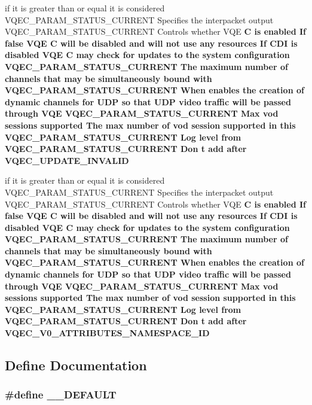 \begin{CompactItemize}
\item 
if it is greater than or equal it is considered VQEC\_\-PARAM\_\-STATUS\_\-CURRENT Specifies the interpacket output VQEC\_\-PARAM\_\-STATUS\_\-CURRENT Controls whether VQE \bf{C} is enabled If false VQE \bf{C} will be disabled and will not use any resources If CDI is disabled VQE \bf{C} may check for updates \bf{to} the system configuration VQEC\_\-PARAM\_\-STATUS\_\-CURRENT The maximum number of \bf{channels} that may be simultaneously bound with VQEC\_\-PARAM\_\-STATUS\_\-CURRENT When enables the creation of dynamic \bf{channels} for UDP so that UDP video traffic will be passed through VQE VQEC\_\-PARAM\_\-STATUS\_\-CURRENT Max vod sessions supported The max number of vod session supported in \bf{this} VQEC\_\-PARAM\_\-STATUS\_\-CURRENT Log level from VQEC\_\-PARAM\_\-STATUS\_\-CURRENT Don t add after \bf{VQEC\_\-UPDATE\_\-INVALID}
\item 
if it is greater than or equal it is considered VQEC\_\-PARAM\_\-STATUS\_\-CURRENT Specifies the interpacket output VQEC\_\-PARAM\_\-STATUS\_\-CURRENT Controls whether VQE \bf{C} is enabled If false VQE \bf{C} will be disabled and will not use any resources If CDI is disabled VQE \bf{C} may check for updates \bf{to} the system configuration VQEC\_\-PARAM\_\-STATUS\_\-CURRENT The maximum number of \bf{channels} that may be simultaneously bound with VQEC\_\-PARAM\_\-STATUS\_\-CURRENT When enables the creation of dynamic \bf{channels} for UDP so that UDP video traffic will be passed through VQE VQEC\_\-PARAM\_\-STATUS\_\-CURRENT Max vod sessions supported The max number of vod session supported in \bf{this} VQEC\_\-PARAM\_\-STATUS\_\-CURRENT Log level from VQEC\_\-PARAM\_\-STATUS\_\-CURRENT Don t add after \bf{VQEC\_\-V0\_\-ATTRIBUTES\_\-NAMESPACE\_\-ID}
\end{CompactItemize}


\subsection{Define Documentation}
\subsubsection{\setlength{\rightskip}{0pt plus 5cm}\#define \_\-\_\-DEFAULT}\label{vqec__cfg__settings_8h_e0d5b995cbcb73740b33621e59fc85be}


